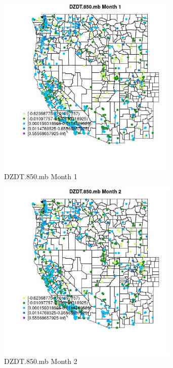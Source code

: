 \begin{figure} 
\centering  
\includegraphics[width=0.77\textwidth]{Code_Outputs/Report_ML_input_PM25_Step4_part_f_de_duplicated_aveswNAs_MapObsMo1DZDT850mb.jpg} 
\caption{\label{fig:Report_ML_input_PM25_Step4_part_f_de_duplicated_aveswNAsMapObsMo1DZDT850mb}DZDT.850.mb Month 1} 
\end{figure} 
 

\begin{figure} 
\centering  
\includegraphics[width=0.77\textwidth]{Code_Outputs/Report_ML_input_PM25_Step4_part_f_de_duplicated_aveswNAs_MapObsMo2DZDT850mb.jpg} 
\caption{\label{fig:Report_ML_input_PM25_Step4_part_f_de_duplicated_aveswNAsMapObsMo2DZDT850mb}DZDT.850.mb Month 2} 
\end{figure} 
 

